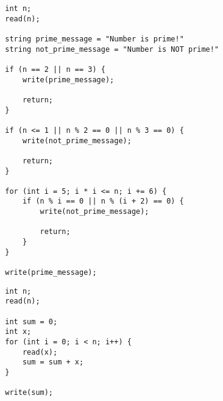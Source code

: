 \documentclass{article}[12pt]
\begin{document}
    \begin{tcolorbox}[
        standard jigsaw,
        title=P2. Check if a number is prime,
        opacityback=0]
    \begin{verbatim}
        int n;
        read(n);

        string prime_message = "Number is prime!"
        string not_prime_message = "Number is NOT prime!"

        if (n == 2 || n == 3) {
            write(prime_message);

            return;
        }

        if (n <= 1 || n % 2 == 0 || n % 3 == 0) {
            write(not_prime_message);
        
            return;
        } 
        
        for (int i = 5; i * i <= n; i += 6) {
            if (n % i == 0 || n % (i + 2) == 0) {
                write(not_prime_message);

                return;
            }
        }

        write(prime_message);
    \end{verbatim}
    \end{tcolorbox}

    \begin{tcolorbox}[
        standard jigsaw,
        title=P3. Compute the sum of $n$ elements,
        opacityback=0]
    \begin{verbatim}
        int n;
        read(n);

        int sum = 0;
        int x;
        for (int i = 0; i < n; i++) {
            read(x);
            sum = sum + x;
        }

        write(sum);
    \end{verbatim}
    \end{tcolorbox}

    \vspace{2em}
\end{document}
